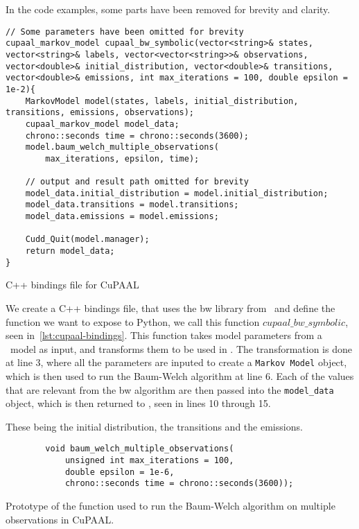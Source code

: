 In the code examples, some parts have been removed for brevity and clarity.


\begin{listing}
    \begin{verbatim}
// Some parameters have been omitted for brevity
cupaal_markov_model cupaal_bw_symbolic(vector<string>& states, vector<string>& labels, vector<vector<string>>& observations, vector<double>& initial_distribution, vector<double>& transitions, vector<double>& emissions, int max_iterations = 100, double epsilon = 1e-2){
    MarkovModel model(states, labels, initial_distribution, transitions, emissions, observations);
    cupaal_markov_model model_data;
    chrono::seconds time = chrono::seconds(3600);
    model.baum_welch_multiple_observations(
        max_iterations, epsilon, time);

    // output and result path omitted for brevity
    model_data.initial_distribution = model.initial_distribution;
    model_data.transitions = model.transitions;
    model_data.emissions = model.emissions;
    
    Cudd_Quit(model.manager);
    return model_data;
}
      \end{verbatim}
    \caption{C++ bindings file for CuPAAL}
    \label{lst:cupaal-bindings}
\end{listing}

We create a C++ bindings file, that uses the \gls{bw} library from \Cupaal\ and define the function we want to expose to Python, we call this function $cupaal\_bw\_symbolic$, seen in~\autoref{lst:cupaal-bindings}.
This function takes model parameters from a \Jajapy\ model as input, and transforms them to be used in \Cupaal.
The transformation is done at line 3, where all the parameters are inputed to create a \texttt{Markov Model} object, which is then used to run the Baum-Welch algorithm at line 6.
Each of the values that are relevant from the \gls{bw} algorithm are then passed into the \texttt{model\_data} object, which is then returned to \Jajapy, seen in lines 10 through 15.

These being the initial distribution, the transitions and the emissions.

\begin{listing}
    \begin{verbatim}
        void baum_welch_multiple_observations(
            unsigned int max_iterations = 100, 
            double epsilon = 1e-6, 
            chrono::seconds time = chrono::seconds(3600));
        \end{verbatim}
    \caption{Prototype of the function used to run the Baum-Welch algorithm on multiple observations in CuPAAL.}
    \label{lst:baum-welch-multiple-observations}
\end{listing}


